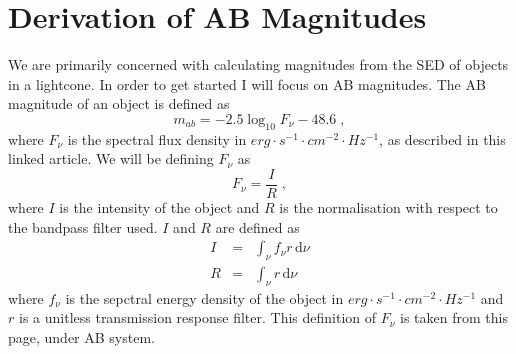 \documentclass[12pt]{scrartcl}
\newcommand{\dx}[1]{\ensuremath{\,\mathrm{d}#1}}
\begin{document}
\maketitle

\section{Derivation of AB Magnitudes}

We are primarily concerned with calculating magnitudes from the SED
of objects in a lightcone. In order to get started I will focus on AB
magnitudes. The AB magnitude of an object is defined as
\[ m_{ab} = -2.5\log_{10}F_{\nu} - 48.6 \; , \]
where $F_\nu$ is the spectral flux density in $erg\cdot s^{-1}\cdot cm^{-2} \cdot Hz^{-1}$,
as described in this linked article. We will be defining $F_\nu$ as
\[ F_\nu = \frac{I}{R} \; , \]
where $I$ is the intensity of the object and $R$ is the normalisation
with respect to the bandpass filter used. $I$ and $R$ are defined
as
\begin{eqnarray*}
I & = & \int_\nu f_\nu r \dx{\nu} \\
R & = & \int_\nu r \dx{\nu}
\end{eqnarray*}
where $f_\nu$ is the sepctral energy density of the object in
$erg\cdot s^{-1}\cdot cm^{-2}\cdot Hz^{-1}$ and $r$ is a unitless transmission
response filter. This definition of $F_\nu$ is taken from this page, under AB system.
\end{document}
